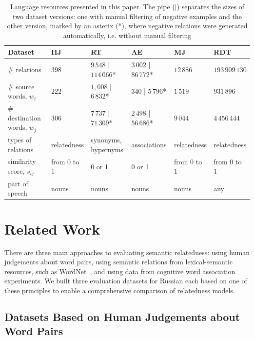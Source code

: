 \documentclass[runningheads,a4paper]{llncs}
\begin{document}
\begin{table}[ht]
\centering
\caption{Language resources presented in this paper. The pipe ($|$) separates the sizes of two dataset versions: one with manual filtering of negative examples and the other version, marked by an asterix (*), where negative relations were generated automatically, i.e. without manual filtering}
\label{tab:resources}
\scriptsize
\begin{tabular}{l|lllll}\toprule
\textbf{Dataset}     & \textbf{HJ}  & \textbf{RT}            & \textbf{AE}           & \textbf{MJ}  & \textbf{RDT}    \\ \midrule
\# relations         & $398$        & $9\,548$ | $114\,066$* &  $3\,002$ | $86\,772$* & $12\,886$    & $193\,909\,130$ \\
\# source words, $w_i$      & $222$        & $1,008$ | $6\,832$*    & $340$ | $5\,796$*     & $1\,519$     & $931\,896$      \\
\# destination words, $w_j$ & $306$        & $7\,737$ | $71\,309$*  & $2\,498$ | $56\,686$* & $9\,044$     & $4\,456\,444$   \\
types of relations   & relatedness  & \parbox{15mm}{synonyms,\\%
                                      hypernyms}             & associations          & relatedness  & relatedness     \\
similarity score, $s_{ij}$     & from 0 to 1  & 0 or 1                 & 0 or 1                & from 0 to 1  & from 0 to 1     \\
part of speech        & nouns & nouns           & nouns          & nouns & any    \\ \bottomrule
\end{tabular}
\end{table}

\section{Related Work}\label{sec:related}

There are three main approaches to evaluating semantic relatedness: using human judgements about word pairs, using semantic relations from lexical-semantic resources, such as WordNet~\cite{Miller:95}, and using data from cognitive word association experiments. We built three evaluation datasets for Russian each based on one of these principles to enable a comprehensive comparison of relatedness models.

\subsection{Datasets Based on Human Judgements about Word Pairs}
\end{document}
